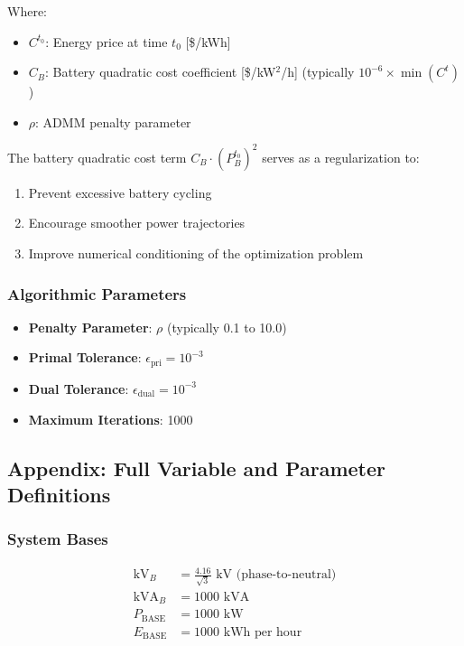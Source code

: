 Where:
\begin{itemize}
    \item $C^{t_0}$: Energy price at time $t_0$ [\$/kWh]
    \item $C_B$: Battery quadratic cost coefficient [\$/kW$^2$/h] (typically $10^{-6} \times \min(C^t)$)
    \item $\rho$: ADMM penalty parameter
\end{itemize}

The battery quadratic cost term $C_B \cdot \left(P_{B}^{t_0}\right)^2$ serves as a regularization to:
\begin{enumerate}
    \item Prevent excessive battery cycling
    \item Encourage smoother power trajectories
    \item Improve numerical conditioning of the optimization problem
\end{enumerate}

\subsubsection{Algorithmic Parameters}

\begin{itemize}
    \item \textbf{Penalty Parameter}: $\rho$ (typically 0.1 to 10.0)
    \item \textbf{Primal Tolerance}: $\epsilon_{\text{pri}} = 10^{-3}$
    \item \textbf{Dual Tolerance}: $\epsilon_{\text{dual}} = 10^{-3}$
    \item \textbf{Maximum Iterations}: 1000
\end{itemize}

\subsection{Appendix: Full Variable and Parameter Definitions}

\subsubsection{System Bases}
\begin{align}
\text{kV}_B &= \frac{4.16}{\sqrt{3}} \text{ kV (phase-to-neutral)} \\
\text{kVA}_B &= 1000 \text{ kVA} \\
P_{\text{BASE}} &= 1000 \text{ kW} \\
E_{\text{BASE}} &= 1000 \text{ kWh per hour}
\end{align}

